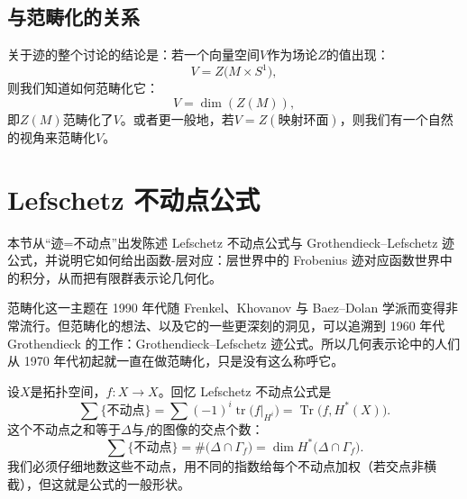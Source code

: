 \subsection{与范畴化的关系}\label{sec:12-6-2}

关于迹的整个讨论的结论是：若一个向量空间$V$作为场论$Z$的值出现：
\begin{equation}\tag{12.68}
V=Z\bigl(M\times S^{1}\bigr),
\end{equation}
则我们知道如何范畴化它：
\begin{equation}\tag{12.69}
V=\dim(Z(M)),
\end{equation}
即$Z(M)$范畴化了$V$。或者更一般地，若$V=Z(\text{映射环面})$，则我们有一个自然的视角来范畴化$V$。


\section{Lefschetz 不动点公式}\label{sec:12-7}

\begin{sectionkey}
本节从“迹=不动点”出发陈述 Lefschetz 不动点公式与 Grothendieck–Lefschetz 迹公式，并说明它如何给出函数-层对应：层世界中的 Frobenius 迹对应函数世界中的积分，从而把有限群表示论几何化。
\end{sectionkey}

范畴化这一主题在 1990 年代随 Frenkel、Khovanov 与 Baez–Dolan 学派而变得非常流行。但范畴化的想法、以及它的一些更深刻的洞见，可以追溯到 1960 年代 Grothendieck 的工作：Grothendieck–Lefschetz 迹公式。所以几何表示论中的人们从 1970 年代初起就一直在做范畴化，只是没有这么称呼它。

设$X$是拓扑空间，$f\colon X\to X$。回忆 Lefschetz 不动点公式是
\begin{equation}\tag{12.70}
\sum\{\text{不动点}\}=\sum(-1)^{i}\operatorname{tr}\bigl(f|_{H^{i}}\bigr)=\operatorname{Tr}\bigl(f,H^{*}(X)\bigr).
\end{equation}
这个不动点之和等于$\Delta$与$f$的图像的交点个数：
\begin{equation}\tag{12.71}
\sum\{\text{不动点}\}=\#\bigl(\Delta\cap\Gamma_{f}\bigr)=\dim H^{*}\bigl(\Delta\cap\Gamma_{f}\bigr).
\end{equation}
我们必须仔细地数这些不动点，用不同的指数给每个不动点加权（若交点非横截），但这就是公式的一般形状。

